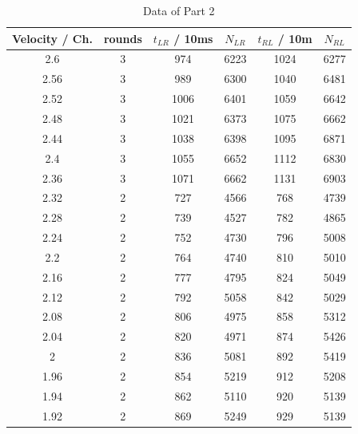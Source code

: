 \documentclass[11pt,a4paper,notitlepage]{scrartcl}
\begin{document}
\begin{table}[H]
	\centering
	\begin{tabular}{c|c|c|c|c|c}
		Velocity / Ch. & rounds & $t_{LR}$  / 10ms & $N_{LR}$  &$t_{RL}$  / 10m & $N_{RL}$  \\
		\hline
		2.6  & 3      & 974         & 6223  & 1024        & 6277  \\
		2.56 & 3      & 989         & 6300  & 1040        & 6481  \\
		2.52 & 3      & 1006        & 6401  & 1059        & 6642  \\
		2.48 & 3      & 1021        & 6373  & 1075        & 6662  \\
		2.44 & 3      & 1038        & 6398  & 1095        & 6871  \\
		2.4  & 3      & 1055        & 6652  & 1112        & 6830  \\
		2.36 & 3      & 1071        & 6662  & 1131        & 6903  \\
		2.32 & 2      & 727         & 4566  & 768         & 4739  \\
		2.28 & 2      & 739         & 4527  & 782         & 4865  \\
		2.24 & 2      & 752         & 4730  & 796         & 5008  \\
		2.2  & 2      & 764         & 4740  & 810         & 5010  \\
		2.16 & 2      & 777         & 4795  & 824         & 5049  \\
		2.12 & 2      & 792         & 5058  & 842         & 5029  \\
		2.08 & 2      & 806         & 4975  & 858         & 5312  \\
		2.04 & 2      & 820         & 4971  & 874         & 5426  \\
		2    & 2      & 836         & 5081  & 892         & 5419  \\
		1.96 & 2      & 854         & 5219  & 912         & 5208  \\
		1.94 & 2      & 862         & 5110  & 920         & 5139  \\
		1.92 & 2      & 869         & 5249  & 929         & 5139  \\
	\end{tabular}
	\caption{Data of Part 2}
\end{table}
\end{document}
